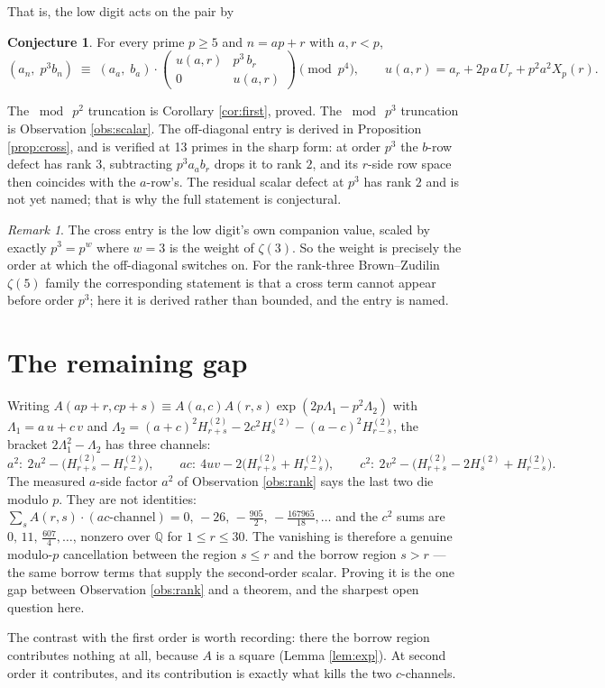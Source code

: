 \documentclass[11pt,a4paper]{amsart}
\theoremstyle{plain}
\theoremstyle{definition}
\newtheorem{conjecture}[theorem]{Conjecture}
\theoremstyle{remark}
\newtheorem{remark}[theorem]{Remark}
\newcommand{\QQ}{\mathbb{Q}}
\newcommand{\A}{A}
\begin{document}
That is, the low digit acts on the pair by

\begin{conjecture}\label{conj:matrix}
For every prime $p\ge5$ and $n=ap+r$ with $a,r<p$,
\[
  (a_n,\;p^3b_n)\;\equiv\;(a_a,\;b_a)\cdot
  \begin{pmatrix} u(a,r) & p^3\,b_r\\[2pt] 0 & u(a,r)\end{pmatrix}
  \pmod{p^4},
  \qquad u(a,r)=a_r+2p\,a\,U_r+p^2a^2X_p(r).
\]
\end{conjecture}

The $\bmod\ p^2$ truncation is Corollary \ref{cor:first}, proved. The $\bmod\ p^3$
truncation is Observation \ref{obs:scalar}. The off-diagonal entry is derived in
Proposition \ref{prop:cross}, and is verified at 13 primes in the sharp form: at order
$p^3$ the $b$-row defect has rank $3$, subtracting $p^3a_ab_r$ drops it to rank $2$, and
its $r$-side row space then coincides with the $a$-row's. The residual scalar defect at
$p^3$ has rank $2$ and is not yet named; that is why the full statement is conjectural.

\begin{remark}
The cross entry is the low digit's own companion value, scaled by exactly $p^{3}=p^{w}$
where $w=3$ is the weight of $\zeta(3)$. So the weight is precisely the order at which
the off-diagonal switches on. For the rank-three Brown--Zudilin $\zeta(5)$ family the
corresponding statement is that a cross term cannot appear before order $p^3$; here it
is derived rather than bounded, and the entry is named.
\end{remark}

\section{The remaining gap}

Writing $\A(ap+r,cp+s)\equiv \A(a,c)\A(r,s)\exp(2p\Lambda_1-p^2\Lambda_2)$ with
$\Lambda_1=a\,u+c\,v$ and
$\Lambda_2=(a+c)^2H^{(2)}_{r+s}-2c^2H^{(2)}_s-(a-c)^2H^{(2)}_{r-s}$, the bracket
$2\Lambda_1^2-\Lambda_2$ has three channels:
\[
  a^2:\ 2u^2-\bigl(H^{(2)}_{r+s}-H^{(2)}_{r-s}\bigr),\qquad
  ac:\ 4uv-2\bigl(H^{(2)}_{r+s}+H^{(2)}_{r-s}\bigr),\qquad
  c^2:\ 2v^2-\bigl(H^{(2)}_{r+s}-2H^{(2)}_s+H^{(2)}_{r-s}\bigr).
\]
The measured $a$-side factor $a^2$ of Observation \ref{obs:rank} says the last two die
modulo $p$. They are not identities: $\sum_s \A(r,s)\cdot(ac\text{-channel})
=0,\,-26,\,-\tfrac{905}2,\,-\tfrac{167965}{18},\dots$ and the $c^2$ sums are
$0,\,11,\,\tfrac{607}4,\dots$, nonzero over $\QQ$ for $1\le r\le30$. The vanishing is
therefore a genuine modulo-$p$ cancellation between the region $s\le r$ and the borrow
region $s>r$ — the same borrow terms that supply the second-order scalar. Proving it is
the one gap between Observation \ref{obs:rank} and a theorem, and the sharpest open
question here.

The contrast with the first order is worth recording: there the borrow region
contributes nothing at all, because $\A$ is a square (Lemma \ref{lem:exp}). At second
order it contributes, and its contribution is exactly what kills the two $c$-channels.
\end{document}
